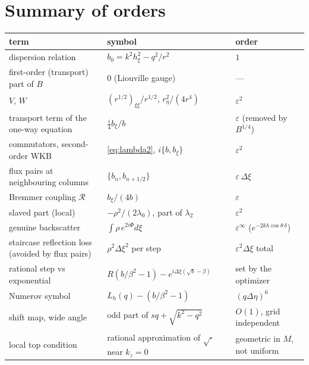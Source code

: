 \documentclass[11pt]{article}
\begin{document}
\section{Summary of orders}

\begin{center}
\begin{tabular}{@{}lll@{}}
\toprule
term & symbol & order \\
\midrule
dispersion relation & $b_0=k^2h_\xi^2-q^2/r^2$ & $1$ \\
first-order (transport) part of $B$ & $0$ (Liouville gauge) & --- \\
$V$, $W$ & $(r^{1/2})_{\xi\xi}/r^{1/2}$, $r_\eta^2/(4r^4)$ & $\varepsilon^2$ \\
transport term of the one-way equation & $\tfrac i4 b_\xi/b$ & $\varepsilon$ (removed by $B^{1/4}$) \\
commutators, second-order WKB & \eqref{eq:lambda2}, $i\{b,b_\xi\}$ & $\varepsilon^2$ \\
flux pairs at neighbouring columns & $\{b_n,b_{n+1/2}\}$ & $\varepsilon\,\Delta\xi$ \\
Bremmer coupling $\mathcal R$ & $b_\xi/(4b)$ & $\varepsilon$ \\
\quad slaved part (local) & $-\rho^2/(2\lambda_0)$, part of $\lambda_2$ & $\varepsilon^2$ \\
\quad genuine backscatter & $\int\rho\,e^{2i\Phi}d\xi$ & $\varepsilon^\infty$ ($e^{-2kh\cos\theta\,\delta}$) \\
staircase reflection loss (avoided by flux pairs) & $\rho^2\Delta\xi^2$ per step & $\varepsilon^2\Delta\xi$ total \\
rational step vs exponential & $R(b/\beta^2-1)-e^{i\Delta\xi(\sqrt b-\beta)}$ & set by the optimizer \\
Numerov symbol & $L_h(q)-(b/\beta^2-1)$ & $(q\Delta\eta)^6$ \\
shift map, wide angle & odd part of $sq+\sqrt{k^2-q^2}$ & $O(1)$, grid independent \\
local top condition & rational approximation of $\sqrt{\cdot}$ near $k_z=0$ & geometric in $M$, not uniform \\
\bottomrule
\end{tabular}
\end{center}
\end{document}
